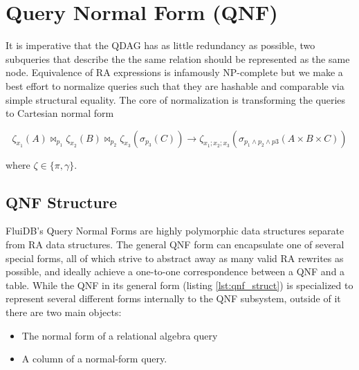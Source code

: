 \section{Query Normal Form (QNF)}
\label{sec:qnf}

It is imperative that the QDAG has as little redundancy as possible,
two subqueries that describe the the same relation should be
represented as the same node. Equivalence of RA expressions is
infamously NP-complete
\cite{sagivEquivalencesRelationalExpressions1980} but we make a best
effort to normalize queries such that they are hashable and comparable
via simple structural equality. The core of normalization is
transforming the queries to Cartesian normal form

\[
  \zeta_{x_1}(A) \Join_{p_1} \zeta_{x_2}(B) \Join_{p_2} \zeta_{x_3} (\sigma_{p_3}(C)) \to \zeta_{x_1;x_2;x_3}(\sigma_{p_1 \land p_2 \land p3}(A \times B \times C))
\]

where \(\zeta \in \{\pi,\gamma\}\).

\subsection{QNF Structure}

FluiDB's Query Normal Forms are highly polymorphic data structures
separate from RA data structures. The general QNF form can encapsulate
one of several special forms, all of which strive to abstract away as
many valid RA rewrites as possible, and ideally achieve a one-to-one
correspondence between a QNF and a table. While the QNF in its general
form (listing \ref{lst:qnf_struct}) is specialized to represent
several different forms internally to the QNF subsystem, outside of it
there are two main objects:

\begin{itemize}
\item The normal form of a relational algebra query
\item A column of a normal-form query.
\end{itemize}

